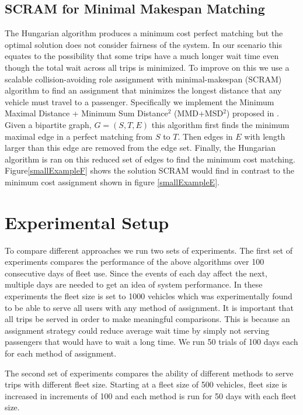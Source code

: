 \documentclass[letterpaper]{article}
\begin{document}
\subsection{SCRAM for Minimal Makespan Matching}

The Hungarian algorithm produces a minimum cost perfect matching but the optimal solution does not consider fairness of the system. In our scenario this equates to the possibility that some trips have a much longer wait time even though the total wait across all trips is minimized. To improve on this we use a scalable collision-avoiding role assignment with minimal-makespan (SCRAM) algorithm to find an assignment that minimizes the longest distance that any vehicle must travel to a passenger. Specifically we implement the Minimum Maximal Distance + Minimum Sum Distance$^2$ (MMD+MSD$^2$) proposed in \cite{macalpine2015scram}. Given a bipartite graph, $G = ({S,T},E)$  this algorithm first finds the minimum maximal edge in a perfect matching from $S$ to $T$. Then edges in $E$ with length larger than this edge are removed from the edge set. Finally, the Hungarian algorithm is ran on this reduced set of edges to find the minimum cost matching. Figure\ref{smallExampleF} shows the solution SCRAM would find in contrast to the minimum cost assignment shown in figure \ref{smallExampleE}. 

\section{Experimental Setup}
To compare different approaches we run two sets of experiments. The first set of experiments compares the performance of the above algorithms over 100 consecutive days of fleet use. Since the events of each day affect the next, multiple days are needed to get an idea of system performance. In these experiments the fleet size is set to 1000 vehicles which was experimentally found to be able to serve all users with any method of assignment. It is important that all trips be served in order to make meaningful comparisons. This is because an assignment strategy could reduce average wait time by simply not serving passengers that would have to wait a long time. We run 50 trials of 100 days each for each method of assignment.

The second set of experiments compares the ability of different methods to serve trips with different fleet size. Starting at a fleet size of 500 vehicles, fleet size is increased in increments of 100 and each method is run for 50 days with each fleet size.
\end{document}
